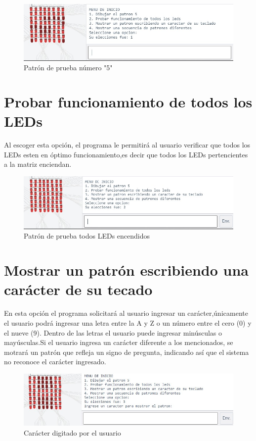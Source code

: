 \documentclass{article}
\begin{document}
    \begin{figure}[h]
    \includegraphics[width=13cm]{5.jpeg}
    \centering
    \caption{Patrón de prueba número "5"}
    \label{5}
    \end{figure}
    
\section{Probar funcionamiento de todos los LEDs}\label{op2}
Al escoger esta opción, el programa le permitirá al usuario verificar que todos los LEDs esten en óptimo funcionamiento,es decir que todos los LEDs pertencientes a la matriz enciendan.

    \begin{figure}[h]
    \includegraphics[width=13cm]{full.jpeg}
    \centering
    \caption{Patrón de prueba todos LEDs encendidos}
    \label{full}
    \end{figure}

\section{Mostrar un patrón escribiendo una carácter de su tecado}\label{op3}
En esta opción el programa solicitará al usuario ingresar un carácter,únicamente el usuario podrá ingresar una letra entre la A y Z o un número entre el cero (0) y el nueve (9). Dentro de las letras el usuario puede ingresar minúsculas o mayúsculas.Si el usuario ingresa un carácter diferente a los mencionados, se motrará un patrón que refleja un signo de pregunta, indicando así que el sistema no reconoce el carácter ingresado.

    \begin{figure}[h]
    \includegraphics[width=13cm]{patron.jpeg}
    \centering
    \caption{Carácter digitado por el usuario}
    \label{patron}
    \end{figure}
    
\end{document}
